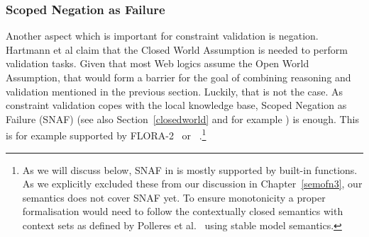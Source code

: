 \subsubsection{Scoped Negation as Failure}
Another aspect which is important for constraint validation is negation.
Hartmann et al claim that the Closed World Assumption is needed to perform validation tasks.
Given that most Web logics assume the Open World Assumption, that would form a barrier for the goal of combining reasoning and validation 
mentioned in the previous section. Luckily, that is not the case.
As constraint validation copes with the local knowledge base,
Scoped Negation as Failure (SNAF) (see also  Section~\ref{closedworld} and for example \cite{damasio2006supporting,kifer2005,polleres2006rules}) is enough.
This is for example supported by FLORA-2~\cite{negflora} or \nthreelogic~\cite{N3Logic}.\footnote{As we will discuss below, SNAF in \nthree is mostly supported by built-in functions. 
As we explicitly excluded these from our discussion in Chapter~\ref{semofn3}, our semantics does not cover SNAF yet. 
To ensure monotonicity a proper formalisation would need to 
 follow 
the contextually closed semantics with context sets as defined by Polleres et al.\ \cite{polleres2006rules} using stable model semantics.}

